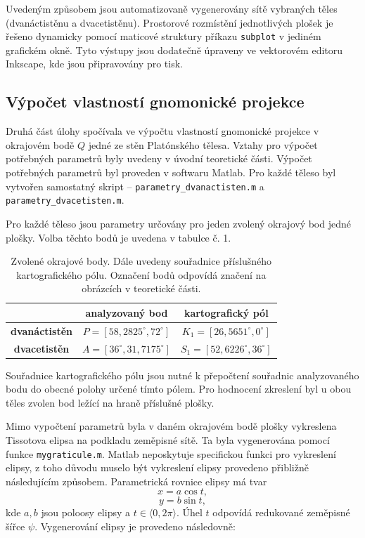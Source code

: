 \documentclass[12pt]{article}
\begin{document}
Uvedeným způsobem jsou automatizovaně vygenerovány sítě vybraných těles (dvanáctistěnu a dvacetistěnu). Prostorové rozmístění jednotlivých plošek je řešeno dynamicky pomocí maticové struktury příkazu \texttt{subplot} v jediném grafickém okně. Tyto výstupy jsou dodatečně úpraveny ve vektorovém editoru Inkscape, kde jsou připravovány pro tisk.
        
    {\subsection {Výpočet vlastností gnomonické projekce}}
Druhá část úlohy spočívala ve výpočtu vlastností gnomonické projekce v okrajovém bodě $Q$ jedné ze stěn Platónského tělesa. Vztahy pro výpočet potřebných parametrů byly uvedeny v úvodní teoretické části. Výpočet potřebných parametrů byl proveden v softwaru Matlab. Pro každé těleso byl vytvořen samostatný skript -- \texttt{parametry\_dvanactisten.m} a \texttt{parametry\_dvacetisten.m}.

Pro každé těleso jsou parametry určovány pro jeden zvolený okrajový bod jedné plošky. Volba těchto bodů je uvedena v tabulce č. 1.

\begin{table}[h]
\centering
\begin{tabular}{|c|c|c|}
\hline
 & analyzovaný bod & kartografický pól \\
\hline
\textbf{dvanáctistěn} & $P = [58{,}2825^\circ, 72^\circ]$ & $K_1 = [26{,}5651^\circ, 0^\circ]$ \\
\hline
\textbf{dvacetistěn} & $A = [36^\circ, 31{,}7175^\circ]$ & $S_1 = [52{,}6226^\circ, 36^\circ]$ \\
\hline
\end{tabular}
\caption{Zvolené okrajové body. Dále uvedeny souřadnice příslušného kartografického pólu. Označení bodů odpovídá značení na obrázcích v teoretické části.}
\label{tab:okrajove_body}
\end{table}

Souřadnice kartografického pólu jsou nutné k přepočtení souřadnic analyzovaného bodu do obecné polohy určené tímto pólem. Pro hodnocení zkreslení byl u obou těles zvolen bod ležící na hraně příslušné plošky.

Mimo vypočtení parametrů byla v daném okrajovém bodě plošky vykreslena Tissotova elipsa na podkladu zeměpisné sítě. Ta byla vygenerována pomocí funkce \texttt{mygraticule.m}. Matlab neposkytuje specifickou funkci pro vykreslení elipsy, z toho důvodu muselo být vykreslení elipsy provedeno přibližně následujícím způsobem. Parametrická rovnice elipsy má tvar
$$ x = a \cos t, $$
$$ y = b \sin t, $$
kde $a, b$ jsou poloosy elipsy a $t \in \langle 0, 2\pi \rangle$. Úhel $t$ odpovídá redukované zeměpisné šířce $\psi$. Vygenerování elipsy je provedeno následovně:
\end{document}

